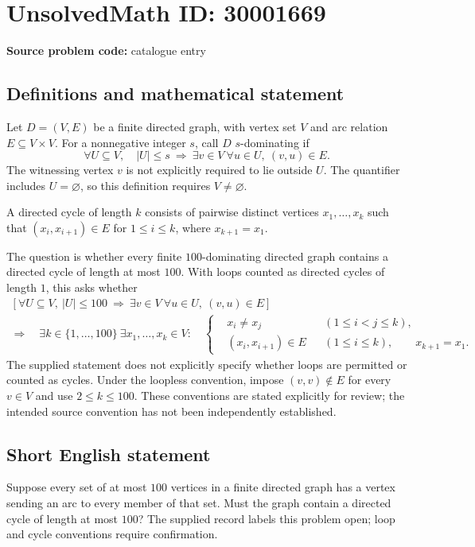 \documentclass[11pt]{article}
\begin{document}
\section*{UnsolvedMath ID: 30001669}
\textbf{Source problem code:} catalogue entry
\subsection{Definitions and mathematical statement}
Let \(D=(V,E)\) be a finite directed graph, with vertex set \(V\) and arc relation \(E\subseteq V\times V\). For a nonnegative integer \(s\), call \(D\) \(s\)-dominating if
\[
\forall U\subseteq V,\quad |U|\le s\ \Longrightarrow\ \exists v\in V\ \forall u\in U,\ (v,u)\in E.
\]
The witnessing vertex \(v\) is not explicitly required to lie outside \(U\). The quantifier includes \(U=\varnothing\), so this definition requires \(V\ne\varnothing\).

A directed cycle of length \(k\) consists of pairwise distinct vertices \(x_1,\ldots,x_k\) such that \((x_i,x_{i+1})\in E\) for \(1\le i\le k\), where \(x_{k+1}=x_1\).

The question is whether every finite \(100\)-dominating directed graph contains a directed cycle of length at most \(100\). With loops counted as directed cycles of length \(1\), this asks whether
\[
\begin{gathered}
\left[\forall U\subseteq V,\ |U|\le100\ \Longrightarrow\ \exists v\in V\ \forall u\in U,\ (v,u)\in E\right]\\
\Longrightarrow\quad
\exists k\in\{1,\ldots,100\}\ \exists x_1,\ldots,x_k\in V:\quad
\left\{
\begin{aligned}
&x_i\ne x_j &&(1\le i<j\le k),\\
&(x_i,x_{i+1})\in E &&(1\le i\le k),\qquad x_{k+1}=x_1.
\end{aligned}
\right.
\end{gathered}
\]
The supplied statement does not explicitly specify whether loops are permitted or counted as cycles. Under the loopless convention, impose \((v,v)\notin E\) for every \(v\in V\) and use \(2\le k\le100\). These conventions are stated explicitly for review; the intended source convention has not been independently established.
\subsection{Short English statement}
Suppose every set of at most \(100\) vertices in a finite directed graph has a vertex sending an arc to every member of that set. Must the graph contain a directed cycle of length at most \(100\)? The supplied record labels this problem open; loop and cycle conventions require confirmation.
\end{document}
